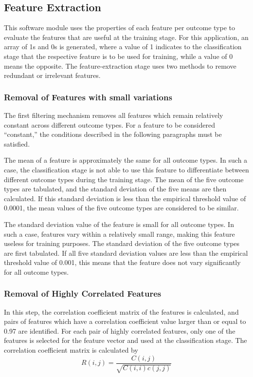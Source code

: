 \documentclass[12pt]{article}
\theoremstyle{definition}
\begin{document}
		
		
		\subsection{Feature Extraction}
		This software module uses the properties of each feature per outcome type to evaluate the features that are useful at the training stage. For this application, an array of 1s and 0s is generated, where a value of 1 indicates to the classification stage that the respective feature is to be used for training, while a value of 0 means the opposite.
		The feature-extraction stage uses two methods to remove redundant or irrelevant features.
			\subsubsection{Removal of Features with small variations}
			The first filtering mechanism removes all features which remain relatively constant across different outcome types. For a feature to be considered “constant,” the conditions described in the following paragraphs must be satisfied.
			
			The mean of a feature is approximately the same for all outcome types. In such a case, the classification stage is not able to use this feature to differentiate between different outcome types during the training stage. The mean of the five outcome types are tabulated, and the standard deviation of the five means are then calculated. If this
			standard deviation is less than the empirical threshold value of 0.0001, the mean values of the five outcome types are considered to be similar.
			
			The standard deviation value of the feature is small for all outcome types. In such a case, features vary within a relatively small range, making this feature useless for training purposes. The standard deviation of the five outcome types are first tabulated. If all five standard deviation values are less than the empirical threshold value of 0.001, this means that the feature does not vary significantly for all outcome types.
			\subsubsection{Removal of Highly Correlated Features}
			In this step, the correlation coefficient matrix of the features is calculated, and pairs of features which have a correlation coefficient value larger than or equal to 0.97 are identified. For each pair of highly correlated features, only one of the features is selected for the feature vector and used at the classification stage. The correlation coefficient matrix is calculated by
			\begin{equation}
			R(i,j) = \frac{C(i, j)}{\sqrt{C(i, i) c(j,j)}}
			\end{equation}
			
\end{document}
